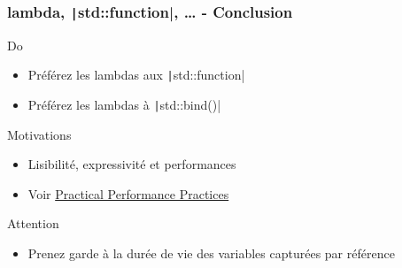 \documentclass[C++.tex]{subfiles}
\begin{document}
\begin{frame}[fragile]
	\frametitle{lambda, \texttt|std::function|, \ldots{} - Conclusion}
	\begin{exampleblock}{Do}
		\begin{itemize}
			\item Préférez les lambdas aux \texttt|std::function|
			\item Préférez les lambdas à \texttt|std::bind()|
		\end{itemize}
	\end{exampleblock}


	\begin{block}{Motivations}
		\begin{itemize}
			\item Lisibilité, expressivité et performances
			\item Voir \href{https://github.com/boostcon/cppnow_presentations_2016/blob/master/00_tuesday/practical_performance_practices.pdf}{Practical Performance Practices\linklogo}
		\end{itemize}

	\end{block}

	\begin{alertblock}{Attention}
		\begin{itemize}
			\item Prenez garde à la durée de vie des variables capturées par référence
		\end{itemize}
	\end{alertblock}
\end{frame}
\end{document}
